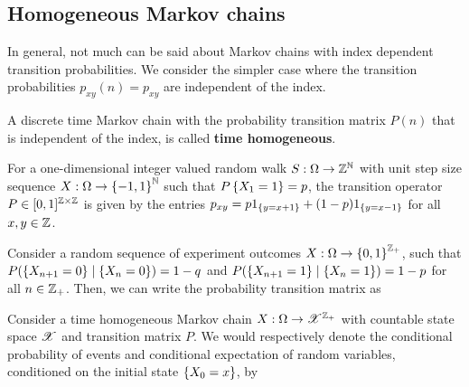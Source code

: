 \documentclass[letterpaper,10pt,english]{article}
\begin{document}
\subsection{Homogeneous Markov chains}
In general, not much can be said about Markov chains with index dependent transition probabilities. 
We consider the simpler case where the transition probabilities $p_{xy}(n)= p_{xy}$ are independent of the index. 
\begin{defn}
A discrete time Markov chain with the probability transition matrix $P(n)$ that is independent of the index, 
is called \textbf{time homogeneous}. %
\end{defn}
\begin{shaded}
\begin{exmp} 
\label{exmp:IRW}
For a one-dimensional integer valued random walk $S: \Omega \to \mathbb{Z}^{\mathbb{N}}$ with \iid unit step size sequence $X: \Omega \to \left\{-1,1\right\}^{\mathbb{N}}$ such that $P\left\{X_1 = 1\right\} = p$, 
the transition operator $P \in [0,1]^{\mathbb{Z}\times\mathbb{Z}}$ is given by the entries 
$
p_{xy} = p1_{\left\{y=x+1\right\}}+(1-p)1_{\left\{y=x-1\right\}} 
$
for all $x,y \in\mathbb{Z}$. 
\end{exmp}
\begin{exmp}
\label{exmp:MarkovBerExp}
Consider a random sequence of experiment outcomes $X: \Omega\to\left\{0,1\right\}^{\mathbb{Z}_+}$, 
such that $P(\left\{X_{n+1} = 0\right\}\mid\left\{X_n=0\right\})= 1-q$ and $P(\left\{X_{n+1} = 1\right\}\mid\left\{X_n=1\right\})= 1-p$ for all $n \in \mathbb{Z}_+$. 
Then, we can write the probability transition matrix as  
\end{exmp}
\end{shaded}
\begin{defn}
Consider a time homogeneous Markov chain $X: \Omega \to \mathscr{X}^{\mathbb{Z}_+}$ %
with countable state space $\mathscr{X}$ and transition matrix $P$. 
We would respectively denote the conditional probability of events and conditional expectation of random variables, conditioned on the initial state $\left\{X_0 = x\right\}$, by 
\end{defn}
\end{document}
